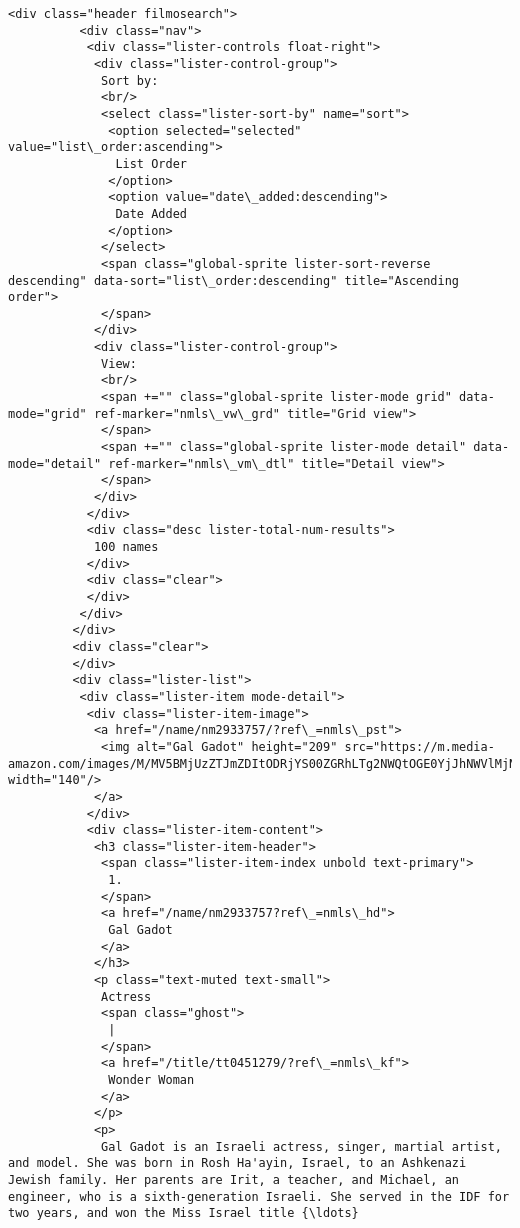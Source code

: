 \documentclass[11pt]{article}
\begin{document}
\begin{Verbatim}[commandchars=\\\{\}]
         <div class="header filmosearch">
          <div class="nav">
           <div class="lister-controls float-right">
            <div class="lister-control-group">
             Sort by:
             <br/>
             <select class="lister-sort-by" name="sort">
              <option selected="selected" value="list\_order:ascending">
               List Order
              </option>
              <option value="date\_added:descending">
               Date Added
              </option>
             </select>
             <span class="global-sprite lister-sort-reverse descending" data-sort="list\_order:descending" title="Ascending order">
             </span>
            </div>
            <div class="lister-control-group">
             View:
             <br/>
             <span +="" class="global-sprite lister-mode grid" data-mode="grid" ref-marker="nmls\_vw\_grd" title="Grid view">
             </span>
             <span +="" class="global-sprite lister-mode detail" data-mode="detail" ref-marker="nmls\_vm\_dtl" title="Detail view">
             </span>
            </div>
           </div>
           <div class="desc lister-total-num-results">
            100 names
           </div>
           <div class="clear">
           </div>
          </div>
         </div>
         <div class="clear">
         </div>
         <div class="lister-list">
          <div class="lister-item mode-detail">
           <div class="lister-item-image">
            <a href="/name/nm2933757/?ref\_=nmls\_pst">
             <img alt="Gal Gadot" height="209" src="https://m.media-amazon.com/images/M/MV5BMjUzZTJmZDItODRjYS00ZGRhLTg2NWQtOGE0YjJhNWVlMjNjXkEyXkFqcGdeQXVyMTg4NDI0NDM@.\_V1\_UY209\_CR34,0,140,209\_AL\_.jpg" width="140"/>
            </a>
           </div>
           <div class="lister-item-content">
            <h3 class="lister-item-header">
             <span class="lister-item-index unbold text-primary">
              1.
             </span>
             <a href="/name/nm2933757?ref\_=nmls\_hd">
              Gal Gadot
             </a>
            </h3>
            <p class="text-muted text-small">
             Actress
             <span class="ghost">
              |
             </span>
             <a href="/title/tt0451279/?ref\_=nmls\_kf">
              Wonder Woman
             </a>
            </p>
            <p>
             Gal Gadot is an Israeli actress, singer, martial artist, and model. She was born in Rosh Ha'ayin, Israel, to an Ashkenazi Jewish family. Her parents are Irit, a teacher, and Michael, an engineer, who is a sixth-generation Israeli. She served in the IDF for two years, and won the Miss Israel title {\ldots}

\end{Verbatim}
\end{document}
